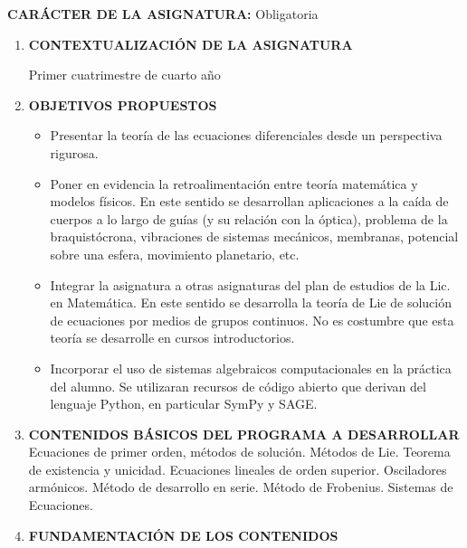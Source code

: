 \textbf{CARÁCTER DE LA ASIGNATURA:} Obligatoria
\renewcommand{\theenumi}{\Alph{enumi}}
\renewcommand{\theenumii}{\theenumi .\arabic{enumii}}
\begin{enumerate}
 \item \textbf{CONTEXTUALIZACIÓN DE LA ASIGNATURA}

 	Primer cuatrimestre de cuarto año

 \item \textbf{OBJETIVOS PROPUESTOS}

          \begin{itemize}
	    \item  Presentar la teoría de las ecuaciones diferenciales desde un perspectiva rigurosa.

	    \item  Poner en evidencia la retroalimentación entre teoría matemática y modelos físicos. En este sentido se desarrollan aplicaciones a la caída de cuerpos a lo largo de guías (y su relación con la óptica), problema de la braquistócrona, vibraciones de sistemas mecánicos, membranas,  potencial sobre una esfera, movimiento planetario, etc.

	    \item  Integrar la asignatura a otras asignaturas del plan de estudios de la Lic. en Matemática. En este sentido se desarrolla la teoría de Lie de solución de ecuaciones por medios de grupos continuos. No es costumbre que esta teoría se desarrolle en cursos introductorios.

\item  Incorporar el uso de sistemas algebraicos computacionales en la práctica del  alumno. Se utilizaran recursos de código abierto que derivan del lenguaje Python, en particular SymPy y SAGE.


       \end{itemize}







 \item\textbf{CONTENIDOS BÁSICOS DEL PROGRAMA A DESARROLLAR}
    Ecuaciones de primer orden, métodos de solución. Métodos de Lie. Teorema de existencia y unicidad. Ecuaciones lineales de orden superior. Osciladores armónicos.   Método de desarrollo en serie. Método de Frobenius.     Sistemas de Ecuaciones.

 \item\textbf{ FUNDAMENTACIÓN DE LOS CONTENIDOS}


\end{enumerate}
